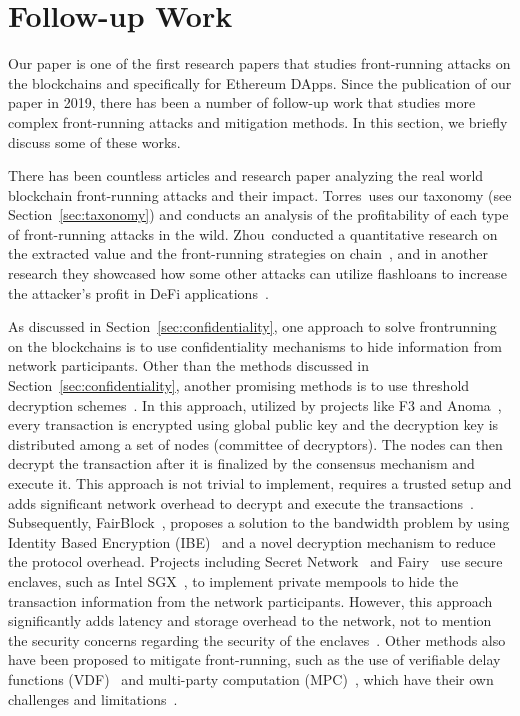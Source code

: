 \section{Follow-up Work}\label{sec:frontrunning:followup}

Our paper is one of the first research papers that studies front-running attacks on the blockchains and specifically for Ethereum DApps. Since the publication of our paper in 2019, there has been a number of follow-up work that studies more complex front-running attacks and mitigation methods. In this section, we briefly discuss some of these works.

There has been countless articles and research paper analyzing the real world blockchain front-running attacks and their impact. Torres~\etal uses our taxonomy (see Section~\ref{sec:taxonomy}) and conducts an analysis of the profitability of each type of front-running attacks in the wild. Zhou~\etal conducted a quantitative research on the extracted value and the front-running strategies on chain~\cite{qin2022quantifying}, and in another research they showcased how some other attacks can utilize flashloans to increase the attacker's profit in DeFi applications~\cite{qin2021attacking}. 

As discussed in Section~\ref{sec:confidentiality}, one approach to solve frontrunning on the blockchains is to use confidentiality mechanisms to hide information from network participants. Other than the methods discussed in Section~\ref{sec:confidentiality}, another promising methods is to use threshold decryption schemes~\cite{breidenbach2021chainlink,bebel2022ferveo}. In this approach, utilized by projects like F3 and Anoma~\cite{zhang2022f3b,asayag2018fair,wang2021ibatch}, every transaction is encrypted using global public key and the decryption key is distributed among a set of nodes (committee of decryptors). The nodes can then decrypt the transaction after it is finalized by the consensus mechanism and execute it. This approach is not trivial to implement, requires a trusted setup and adds significant network overhead to decrypt and execute the transactions~\cite{momeni2022fairblock}. Subsequently, FairBlock~\cite{momeni2022fairblock}, proposes a solution to the bandwidth problem by using Identity Based Encryption (IBE)~\cite{boneh2001identity} and a novel decryption mechanism to reduce the protocol overhead. Projects including Secret Network~\cite{secretnetwork} and Fairy~\cite{stathakopoulou2021adding} use secure enclaves, such as Intel SGX~\cite{costan2016intel}, to implement private mempools to hide the transaction information from the network participants. However, this approach significantly adds latency and storage overhead to the network, not to mention the security concerns regarding the security of the enclaves~\cite{SGX1,SGX2,SGX3,SGX4}. Other methods also have been proposed to mitigate front-running, such as the use of verifiable delay functions (VDF)~\cite{boneh2018verifiable,veedostarkware} and multi-party computation (MPC)~\cite{zhao2019secure,ciampi2022fairmm,govindarajan2022privacy}, which have their own challenges and limitations~\cite{momeni2022fairblock}.


